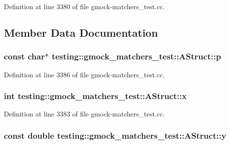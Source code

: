 Definition at line 3380 of file gmock-\/matchers\+\_\+test.\+cc.



\subsection{Member Data Documentation}
\subsubsection[{\texorpdfstring{p}{p}}]{\setlength{\rightskip}{0pt plus 5cm}const char$\ast$ testing\+::gmock\+\_\+matchers\+\_\+test\+::\+A\+Struct\+::p}\hypertarget{structtesting_1_1gmock__matchers__test_1_1_a_struct_a65755db7d763d53c13483bb520f1efcd}{}\label{structtesting_1_1gmock__matchers__test_1_1_a_struct_a65755db7d763d53c13483bb520f1efcd}


Definition at line 3386 of file gmock-\/matchers\+\_\+test.\+cc.

\subsubsection[{\texorpdfstring{x}{x}}]{\setlength{\rightskip}{0pt plus 5cm}int testing\+::gmock\+\_\+matchers\+\_\+test\+::\+A\+Struct\+::x}\hypertarget{structtesting_1_1gmock__matchers__test_1_1_a_struct_a539eea02599ad34ff2bf90cc2c1adf26}{}\label{structtesting_1_1gmock__matchers__test_1_1_a_struct_a539eea02599ad34ff2bf90cc2c1adf26}


Definition at line 3383 of file gmock-\/matchers\+\_\+test.\+cc.

\subsubsection[{\texorpdfstring{y}{y}}]{\setlength{\rightskip}{0pt plus 5cm}const double testing\+::gmock\+\_\+matchers\+\_\+test\+::\+A\+Struct\+::y}\hypertarget{structtesting_1_1gmock__matchers__test_1_1_a_struct_a08b8592764aa4775c3d5a3542470f8bb}{}\label{structtesting_1_1gmock__matchers__test_1_1_a_struct_a08b8592764aa4775c3d5a3542470f8bb}


